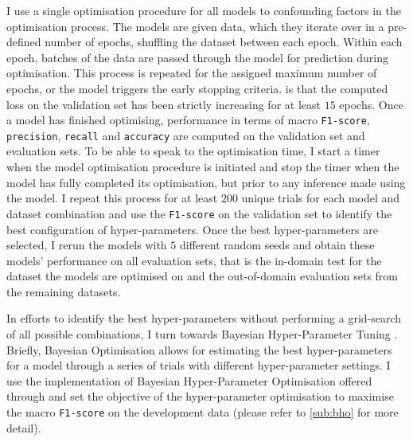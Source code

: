I use a single optimisation procedure for all models to  confounding factors in the optimisation process.
The models are given data, which they iterate over in a pre-defined number of epochs, shuffling the dataset between each epoch.
Within each epoch, batches of the data  are passed through the model for prediction during optimisation.
This process is repeated for the assigned maximum number of epochs, or  the model triggers the early stopping \citep{Prechelt:1998} criteria. 
 is that the computed loss on the validation set has been strictly increasing for at least $15$ epochs.
Once a model has finished optimising, performance in terms of macro \texttt{F1-score}, \texttt{precision}, \texttt{recall} and \texttt{accuracy} are computed on the validation set and evaluation sets.
To be able to speak to the optimisation time, I start a timer when the model optimisation procedure is initiated and stop the timer when the model has fully completed its optimisation, but prior to any inference made using the model.
I repeat this process for at least $200$ unique trials for each model and dataset combination and use the \texttt{F1-score} on the validation set to identify the best configuration of hyper-parameters.
Once the best hyper-parameters are selected, I rerun the models with $5$ different random seeds and obtain these models' performance on all evaluation sets, that is the in-domain test for the dataset the models are optimised on and the out-of-domain evaluation sets from the remaining datasets.

In efforts to identify the best hyper-parameters without performing a grid-search of all possible combinations, I turn towards Bayesian Hyper-Parameter Tuning \citep{Neal:1996}.
Briefly, Bayesian Optimisation allows for estimating the best hyper-parameters for a model through a series of trials with different hyper-parameter settings.
I use the implementation of Bayesian Hyper-Parameter Optimisation offered through \citet{Wandb} and set the objective of the hyper-parameter optimisation to maximise the macro \texttt{F1-score} on the development data (please refer to \cref{sub:bho} for more detail).

